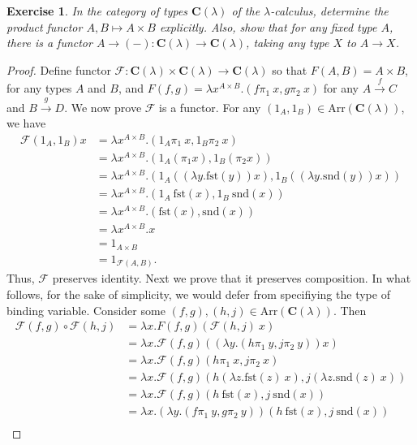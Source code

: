 \documentclass[a4paper, 11pt]{book}
\theoremstyle{plain}
\newtheorem{exercise}{Exercise}[chapter]
\theoremstyle{plain}
\newcommand{\arr}{\rightarrow}
\newcommand{\mc}{\mathcal}
\newcommand{\warr}{\xrightarrow}
\newcommand{\C}{\mathbf{C}}
\newcommand{\F}{\mc{F}}
\newcommand{\fst}{\text{fst}}
\newcommand{\snd}{\text{snd}}
\newcommand{\Arr}{\text{Arr}}
\begin{document}
  \begin{exercise}
    In the category of types $\C(\lambda)$ of the $\lambda$-calculus, determine the product functor $A,B \mapsto A \times B$ explicitly. Also, show that for any fixed type $A$, there is a functor $A \arr (-): \C(\lambda) \arr \C(\lambda)$, taking any type $X$ to $ A \arr X$.
  \end{exercise}
  \begin{proof}
    Define functor $\F:\C(\lambda) \times \C(\lambda) \arr \C(\lambda)$ so that $F(A,B)=A \times B$, for any types $A$ and $B$, and $F(f,g)=\lambda x^{A \times B}. (f \pi_1 ~ x, g \pi_2 ~ x)$ for any $A \warr{f} C$ and $B \warr{g} D$. We now prove $\F$ is a functor. For any $(1_A, 1_B) \in \Arr (\C(\lambda))$, we have 
    \begin{align*}
      \F(1_A,1_B) x &= \lambda x^{A \times B}. (1_A \pi_1 ~ x, 1_B \pi_2 ~ x) \\
      &= \lambda x^{A \times B}. (1_A (\pi_1 x), 1_B(\pi_2 x)) \\
      &= \lambda x^{A \times B}. (1_A ((\lambda y. \fst(y))x), 1_B((\lambda y. \snd(y))x)) \\
      &= \lambda x^{A \times B}. (1_A ~ \fst(x), 1_B ~ \snd (x)) \\
      &= \lambda x^{A \times B}. (\fst(x), \snd(x)) \\
      &= \lambda x^{A \times B}. x \\
      &= 1_{A \times B} \\
      &= 1_{\F(A,B)}.
    \end{align*}
    Thus, $\F$ preserves identity. Next we prove that it preserves composition. In what follows, for the sake of simplicity, we would defer from specifiying the type of binding variable. Consider some $(f,g), (h,j) \in \Arr(\C(\lambda))$. Then 
    \begin{align*}
      \F(f,g) \circ \F(h,j) &= \lambda x. F(f,g) \left( \F(h,j) ~ x \right) \\
      &= \lambda x. \F(f,g) \left( (\lambda y. (h \pi_1 ~ y, j \pi_2 ~ y)) x\right) \\
      &=\lambda x. \F(f,g) (h \pi_1 ~ x, j \pi_2 ~ x) \\
      &= \lambda x. \F(f,g) ( h (\lambda z. \fst (z) ~ x), j (\lambda z.\snd(z) ~ x)) \\
      &= \lambda x. \F(f,g) (h ~ \fst (x), j ~ \snd(x)) \\
      &=\lambda x. (\lambda y. (f \pi_1 ~ y, g \pi_2 ~ y))(h ~ \fst(x), j ~ \snd(x)) \\

\end{align*}
\end{proof}
\end{document}
